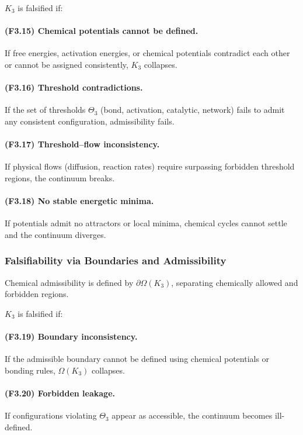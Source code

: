 $K_3$ is falsified if:

\paragraph{(F3.15) Chemical potentials cannot be defined.}
If free energies, activation energies, or chemical potentials contradict
each other or cannot be assigned consistently, $K_3$ collapses.

\paragraph{(F3.16) Threshold contradictions.}
If the set of thresholds $\Theta_3$ (bond, activation, catalytic,
network) fails to admit any consistent configuration, admissibility
fails.

\paragraph{(F3.17) Threshold–flow inconsistency.}
If physical flows (diffusion, reaction rates) require surpassing
forbidden threshold regions, the continuum breaks.

\paragraph{(F3.18) No stable energetic minima.}
If potentials admit no attractors or local minima,
chemical cycles cannot settle and the continuum diverges.



\subsubsection{Falsifiability via Boundaries and Admissibility}

Chemical admissibility is defined by $\partial\Omega(K_3)$, separating
chemically allowed and forbidden regions.

$K_3$ is falsified if:

\paragraph{(F3.19) Boundary inconsistency.}
If the admissible boundary cannot be defined using chemical potentials
or bonding rules, $\Omega(K_3)$ collapses.

\paragraph{(F3.20) Forbidden leakage.}
If configurations violating $\Theta_3$ appear as accessible, the
continuum becomes ill-defined.

